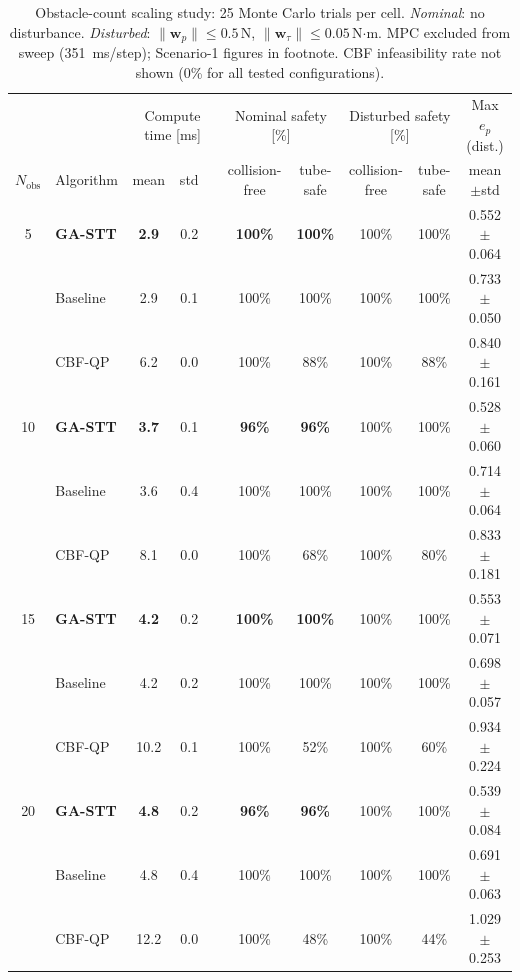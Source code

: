 \begin{table}[t]
\centering
\caption{Obstacle-count scaling study: 25 Monte Carlo trials per cell.
  \emph{Nominal}: no disturbance.
  \emph{Disturbed}: $\|\mathbf{w}_p\|\le 0.5$\,N, $\|\mathbf{w}_\tau\|\le 0.05$\,N$\cdot$m.
  MPC excluded from sweep (\SI{351}{ms}/step); Scenario-1 figures in footnote.
  CBF infeasibility rate not shown (0\% for all tested configurations).}
\label{tab:scaling}
\begin{tabular}{cl ccc cc cc c}
\toprule
& & \multicolumn{3}{c}{Compute time [ms]} &
  \multicolumn{2}{c}{Nominal safety [\%]} &
  \multicolumn{2}{c}{Disturbed safety [\%]} &
  Max $e_p$ (dist.) \\
\cmidrule(lr){3-5}\cmidrule(lr){6-7}\cmidrule(lr){8-9}
$N_\text{obs}$ & Algorithm &
  mean & std & &
  collision-free & tube-safe &
  collision-free & tube-safe &
  mean$\pm$std \\
\midrule
5 & \textbf{GA-STT} & \textbf{2.9}  &  0.2  &  &  \textbf{100\%} & \textbf{100\%} & 100\% & 100\% & 0.552$\pm$0.064 \\
 & Baseline & 2.9  &  0.1  &  &  100\% & 100\% & 100\% & 100\% & 0.733$\pm$0.050 \\
 & CBF-QP & 6.2  &  0.0  &  &  100\% & 88\% & 100\% & 88\% & 0.840$\pm$0.161 \\
\midrule
10 & \textbf{GA-STT} & \textbf{3.7}  &  0.1  &  &  \textbf{96\%} & \textbf{96\%} & 100\% & 100\% & 0.528$\pm$0.060 \\
 & Baseline & 3.6  &  0.4  &  &  100\% & 100\% & 100\% & 100\% & 0.714$\pm$0.064 \\
 & CBF-QP & 8.1  &  0.0  &  &  100\% & 68\% & 100\% & 80\% & 0.833$\pm$0.181 \\
\midrule
15 & \textbf{GA-STT} & \textbf{4.2}  &  0.2  &  &  \textbf{100\%} & \textbf{100\%} & 100\% & 100\% & 0.553$\pm$0.071 \\
 & Baseline & 4.2  &  0.2  &  &  100\% & 100\% & 100\% & 100\% & 0.698$\pm$0.057 \\
 & CBF-QP & 10.2  &  0.1  &  &  100\% & 52\% & 100\% & 60\% & 0.934$\pm$0.224 \\
\midrule
20 & \textbf{GA-STT} & \textbf{4.8}  &  0.2  &  &  \textbf{96\%} & \textbf{96\%} & 100\% & 100\% & 0.539$\pm$0.084 \\
 & Baseline & 4.8  &  0.4  &  &  100\% & 100\% & 100\% & 100\% & 0.691$\pm$0.063 \\
 & CBF-QP & 12.2  &  0.0  &  &  100\% & 48\% & 100\% & 44\% & 1.029$\pm$0.253 \\

\end{tabular}
\end{table}
